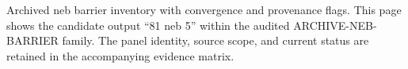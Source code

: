 Archived neb barrier inventory with convergence and provenance flags. This page shows the candidate output ``81 neb 5'' within the audited ARCHIVE-NEB-BARRIER family. The panel identity, source scope, and current status are retained in the accompanying evidence matrix.
